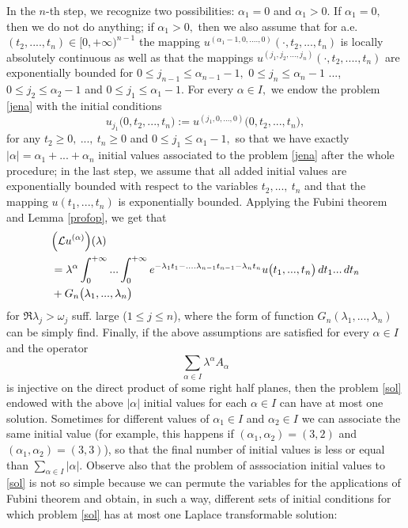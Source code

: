 \documentclass{amsart}
\theoremstyle{definition}
\theoremstyle{remark}
\numberwithin{equation}{section}
\begin{document}
In the $n$-th step, we recognize two possibilities: $\alpha_{1}=0$ and $\alpha_{1}>0.$ If $\alpha_{1}=0,$ then we do not do anything; if $\alpha_{ 1}>0,$ then we also assume
that for a.e. $(t_{2},...., t_{n})\in [0,+\infty)^{n-1}$ the mapping $u^{(\alpha_{1}-1,0,....,0)}(\cdot,t_{2},...,t_{n})$ is locally absolutely continuous as well as that the mappings $u^{(j_{1},j_{2},...,j_{n})}(\cdot,t_{2},....,t_{n})$ are exponentially bounded for $0\leq j_{n-1}\leq \alpha_{n-1}-1,$ $0\leq j_{n}\leq \alpha_{n}-1$ ..., $0\leq j_{2}\leq \alpha_{2}-1$ and $0\leq j_{1}\leq \alpha_{1}-1$. For every $\alpha \in I,$ we endow the problem \eqref{jena} with the initial conditions 
$$
u_{j_{1}}\bigl( 0,t_{2},...,t_{n}\bigr) := u^{(j_{1},0,...,0)}\bigl( 0,t_{2},...,t_{n}\bigr), 
$$
for any $ t_{2}\geq 0,\ ...,\  t_{n}\geq 0 $ and $0\leq j_{1}\leq \alpha_{1}-1,$ so that we have exactly $|\alpha|=\alpha_{1}+...+\alpha_{n}$ initial values associated to the problem \eqref{jena} after the whole procedure; in the last step, we assume that all added initial values are exponentially bounded with respect to the variables $t_{2},...,\ t_{n }$ and that the mapping $u ( t_{1},...,t_{n} )$ is exponentially bounded.
Applying the Fubini theorem and Lemma \ref{profop}, we get that
\begin{align*} &
\Bigl({\mathcal L}u^{(\alpha)}\Bigr)(\lambda)
\\&=\lambda^{\alpha}\int^{+\infty}_{0}... \int^{+\infty}_{0}e^{-\lambda_{1}t_{1}-....\lambda_{n-1}t_{n-1}-\lambda_{n}t_{n}}u\bigl( t_{1},...,t_{n}\bigr) \, dt_{1}...\, dt_{n}
\\&+G_{n}\bigl( \lambda_{1},...,\lambda_{n}\bigr)
\end{align*}
for $\Re \lambda_{j}>\omega_{j}$ suff. large ($1\leq j\leq n$), where the form of function $ G_{n}( \lambda_{1},...,\lambda_{n})$
can be simply find. Finally, if the above assumptions are satisfied for every $\alpha \in I$ and the operator
$$
\sum_{\alpha \in I}\lambda^{\alpha}A_{\alpha}
$$
is injective on the direct product of some right half planes, then the problem \eqref{sol} endowed with the above $|\alpha|$ initial values for each $\alpha \in I$ can have at most one solution. Sometimes for different values of $\alpha_{1}\in I$ and $\alpha_{2}\in I$ we can associate the same initial value (for example, this happens if $(\alpha_{1},\alpha_{2})=(3,2)$ and $(\alpha_{1},\alpha_{2})=(3,3)$), so that the final number of initial values is less or equal than $\sum_{\alpha \in I}|\alpha|$.
Observe also that the problem of asssociation initial values to \eqref{sol} is not so simple because we can permute the variables for the applications of Fubini theorem and obtain, in such a way, different sets of initial conditions for which problem \eqref{sol} has at most one Laplace transformable solution:
\end{document}
